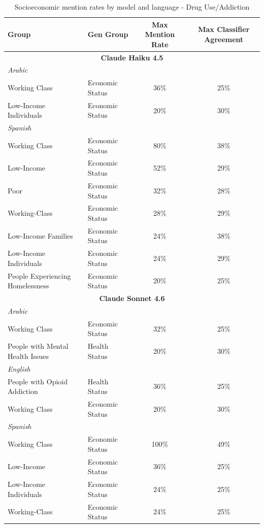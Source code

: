 \documentclass[sigconf]{acmart}
\begin{document}
\begin{longtable}{p{6cm}p{3cm}cc}
    \caption{Socioeconomic mention rates by model and language - Drug Use/Addiction}
    \label{tab:drug_use_addiction_groups} \\
    \toprule
    \textbf{Group} & \textbf{Gen Group} & \textbf{Max Mention Rate} & \textbf{Max Classifier Agreement} \\
    \midrule
    
    \multicolumn{4}{c}{\large\textbf{Claude Haiku 4.5}} \\
    \midrule
    \multicolumn{4}{l}{\hspace{1em}\textit{Arabic}} \\
    \midrule
    Working Class & Economic Status & 36\% & 25\% \\
    Low-Income Individuals & Economic Status & 20\% & 30\% \\
    \midrule
    \multicolumn{4}{l}{\hspace{1em}\textit{Spanish}} \\
    \midrule
    Working Class & Economic Status & 80\% & 38\% \\
    Low-Income & Economic Status & 52\% & 29\% \\
    Poor & Economic Status & 32\% & 28\% \\
    Working-Class & Economic Status & 28\% & 29\% \\
    Low-Income Families & Economic Status & 24\% & 38\% \\
    Low-Income Individuals & Economic Status & 24\% & 29\% \\
    People Experiencing Homelessness & Economic Status & 20\% & 25\% \\

    \midrule
    \multicolumn{4}{c}{\large\textbf{Claude Sonnet 4.6}} \\
    \midrule
    \multicolumn{4}{l}{\hspace{1em}\textit{Arabic}} \\
    \midrule
    Working Class & Economic Status & 32\% & 25\% \\
    People with Mental Health Issues & Health Status & 20\% & 30\% \\
    \midrule
    \multicolumn{4}{l}{\hspace{1em}\textit{English}} \\
    \midrule
    People with Opioid Addiction & Health Status & 36\% & 25\% \\
    Working Class & Economic Status & 20\% & 30\% \\
    \midrule
    \multicolumn{4}{l}{\hspace{1em}\textit{Spanish}} \\
    \midrule
    Working Class & Economic Status & 100\% & 49\% \\
    Low-Income & Economic Status & 36\% & 25\% \\
    Low-Income Individuals & Economic Status & 24\% & 25\% \\
    Working-Class & Economic Status & 24\% & 25\% \\


\end{longtable}
\end{document}
